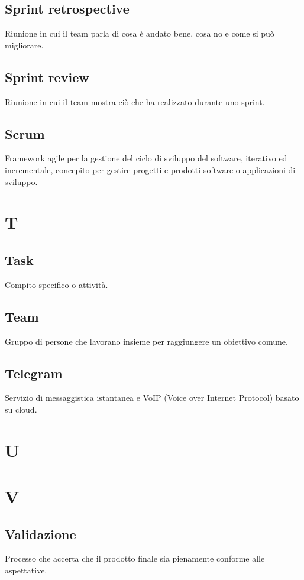     \subsection{Sprint retrospective}
    \label{Sprint retrospective}
    Riunione in cui il team parla di cosa è andato bene, cosa no e come si può migliorare.
    \subsection{Sprint review} 
    Riunione in cui il team mostra ciò che ha realizzato durante uno sprint.
    \subsection{Scrum}
    Framework agile per la gestione del ciclo di sviluppo del software, 
    iterativo ed incrementale, concepito per gestire progetti e prodotti software 
    o applicazioni di sviluppo.

\pagebreak
\section{T}
    \subsection{Task}
    Compito specifico o attività.
    \subsection{Team}
    \label{Team}
    Gruppo di persone che lavorano insieme per raggiungere un obiettivo comune.
    \subsection{Telegram}
    Servizio di messaggistica istantanea e VoIP (Voice over Internet Protocol)
    basato su cloud.
\pagebreak
\section{U}
\pagebreak
\section{V}
    \subsection{Validazione}
    Processo che accerta che il prodotto finale sia pienamente conforme alle aspettative.
